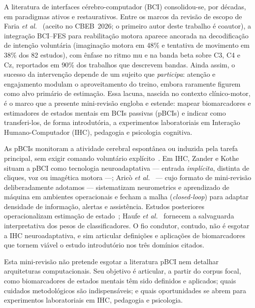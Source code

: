 \documentclass[12pt]{article}
\begin{document}
A literatura de interfaces c\'{e}rebro-computador (BCI) consolidou-se, por d\'{e}cadas, em paradigmas ativos e restaurativos. Entre os marcos da revis\~{a}o de escopo de Faria \textit{et al.}~\cite{Faria2026} (aceito no CBEB~2026; o primeiro autor deste trabalho \'{e} coautor), a integra\c{c}\~{a}o BCI--FES para reabilita\c{c}\~{a}o motora aparece ancorada na decodifica\c{c}\~{a}o de inten\c{c}\~{a}o volunt\'{a}ria (imagina\c{c}\~{a}o motora em 48\% e tentativa de movimento em 38\% dos 82 estudos), com \^{e}nfase no ritmo mu e na banda beta sobre C3, C4 e Cz, reportados em 90\% dos trabalhos que descrevem bandas. Ainda assim, o sucesso da interven\c{c}\~{a}o depende de um sujeito que \textit{participa}: aten\c{c}\~{a}o e engajamento modulam o aproveitamento do treino, embora raramente figurem como alvo prim\'{a}rio de estima\c{c}\~{a}o. Essa lacuna, nascida no contexto cl\'{i}nico-motor, \'{e} o marco que a presente mini-revis\~{a}o engloba e estende: mapear biomarcadores e estimadores de estados mentais em BCIs passivas (pBCIs) e indicar como transferi-los, de forma introdut\'{o}ria, a experimentos laboratoriais em Intera\c{c}\~{a}o Humano-Computador (IHC), pedagogia e psicologia cognitiva.

As pBCIs monitoram a atividade cerebral espont\^{a}nea ou induzida pela tarefa principal, sem exigir comando volunt\'{a}rio expl\'{i}cito~\cite{Arico2017,Zander2016}. Em IHC, Zander e Kothe~\cite{Zander2016} situam a pBCI como tecnologia neuroadaptativa --- entrada \textit{impl\'{i}cita}, distinta de cliques, voz ou imag\'{e}tica motora ---; Aric\`{o} \textit{et al.}~\cite{Arico2017} --- cujo formato de mini-revis\~{a}o deliberadamente adotamos --- sistematizam neurometrics e aprendizado de m\'{a}quina em ambientes operacionais e fecham a malha (\textit{closed-loop}) para adaptar densidade de informa\c{c}\~{a}o, alertas e assist\^{e}ncia. Estudos posteriores operacionalizam estima\c{c}\~{a}o de estado~\cite{Arif2023,Rutkowski2023,Ko2021}; Haufe \textit{et al.}~\cite{Haufe2014} fornecem a salvaguarda interpretativa dos pesos de classificadores. O fio condutor, contudo, n\~{a}o \'{e} esgotar a IHC neuroadaptativa, e sim articular defini\c{c}\~{o}es e aplica\c{c}\~{o}es de biomarcadores que tornem vi\'{a}vel o estudo introdut\'{o}rio nos tr\^{e}s dom\'{i}nios citados.

Esta mini-revis\~{a}o n\~{a}o pretende esgotar a literatura pBCI nem detalhar arquiteturas computacionais. Seu objetivo \'{e} articular, a partir do corpus focal, como biomarcadores de estados mentais t\^{e}m sido definidos e aplicados; quais cuidados metodol\'{o}gicos s\~{a}o indispens\'{a}veis; e quais oportunidades se abrem para experimentos laboratoriais em IHC, pedagogia e psicologia.
\end{document}
